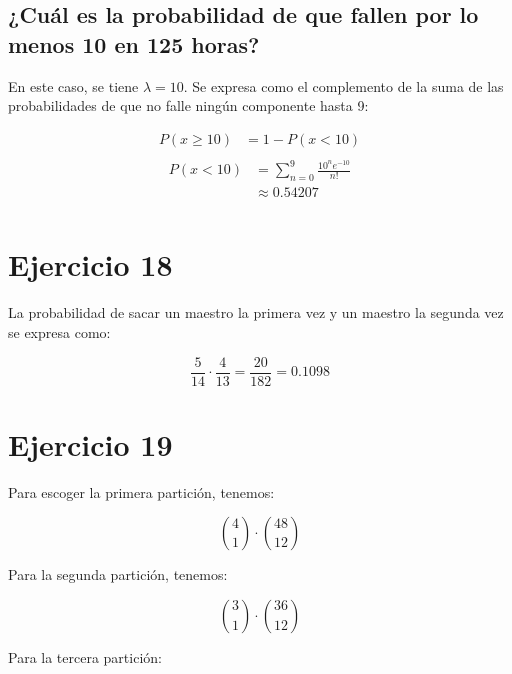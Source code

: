 \documentclass[letterpaper,12pt]{memoir}
\theoremstyle{definition}
\begin{document}
\subsection*{¿Cuál es la probabilidad de que fallen por lo menos 10 en 125 horas?}

En este caso, se tiene \(\lambda = 10\). Se expresa como el complemento de la suma de las probabilidades de que no falle ningún componente hasta 9:

\begin{equation*}
  \begin{split}
  P(x\geq10)&= 1 - P(x<10)\\
  \end{split}
  \end{equation*}
  \begin{equation*}
  \begin{split}
  P(x<10)&= \sum_{n=0}^{9} \frac{10^ne^{-10}}{n!}\\
  &\approx 0.54207\\
  \end{split}
\end{equation*}


\section*{Ejercicio 18}

La probabilidad de sacar un maestro la primera vez y un maestro la segunda vez se expresa como:

\begin{equation*}
	\frac{5}{14} \cdot \frac{4}{13} = \frac{20}{182} = 0.1098
\end{equation*}


\section*{Ejercicio 19}


Para escoger la primera partición, tenemos:

\begin{equation}
  \binom{4}{1} \cdot \binom{48}{12}
\end{equation}

Para la segunda partición, tenemos:

\begin{equation}
  \binom{3}{1} \cdot \binom{36}{12}
\end{equation}

Para la tercera partición:
\end{document}
